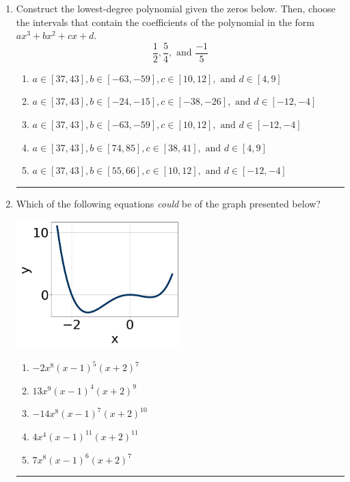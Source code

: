 \documentclass[14pt]{extbook}
\newcommand{\litem}[1]{\item#1\hspace*{-1cm}\rule{\textwidth}{0.4pt}}
\begin{document}
\begin{enumerate}
{\begin{enumerate}[label=\Alph*.]
\end{enumerate} }
\litem{
Construct the lowest-degree polynomial given the zeros below. Then, choose the intervals that contain the coefficients of the polynomial in the form $ax^3+bx^2+cx+d$.\[ \frac{1}{2}, \frac{5}{4}, \text{ and } \frac{-1}{5} \]\begin{enumerate}[label=\Alph*.]
\item \( a \in [37, 43], b \in [-63, -59], c \in [10, 12], \text{ and } d \in [4, 9] \)
\item \( a \in [37, 43], b \in [-24, -15], c \in [-38, -26], \text{ and } d \in [-12, -4] \)
\item \( a \in [37, 43], b \in [-63, -59], c \in [10, 12], \text{ and } d \in [-12, -4] \)
\item \( a \in [37, 43], b \in [74, 85], c \in [38, 41], \text{ and } d \in [4, 9] \)
\item \( a \in [37, 43], b \in [55, 66], c \in [10, 12], \text{ and } d \in [-12, -4] \)

\end{enumerate} }
\litem{
Which of the following equations \textit{could} be of the graph presented below?
\begin{center}
    \includegraphics[width=0.5\textwidth]{../Figures/polyGraphToFunctionCopyC.png}
\end{center}
\begin{enumerate}[label=\Alph*.]
\item \( -2x^{8} (x - 1)^{5} (x + 2)^{7} \)
\item \( 13x^{9} (x - 1)^{4} (x + 2)^{9} \)
\item \( -14x^{8} (x - 1)^{7} (x + 2)^{10} \)
\item \( 4x^{4} (x - 1)^{11} (x + 2)^{11} \)
\item \( 7x^{8} (x - 1)^{6} (x + 2)^{7} \)

\end{enumerate} }
\end{enumerate}
\end{document}
